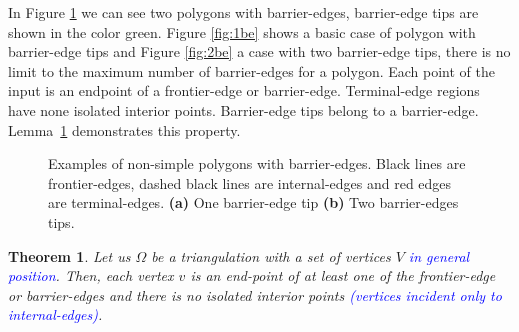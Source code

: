\documentclass[pdflatex,sn-mathphys]{sn-jnl}%
\theoremstyle{thmstyleone}%
\newtheorem{theorem}{Theorem}%
\theoremstyle{thmstyletwo}%
\theoremstyle{thmstylethree}%
\begin{document}
 
In Figure \ref{figs:kindofbarrieredges} we can see two polygons with barrier-edges, barrier-edge tips are shown in the color green. Figure \ref{fig:1be} shows a basic case of polygon with barrier-edge tips and Figure \ref{fig:2be} a case with two barrier-edge tips, there is no limit to the maximum number of barrier-edges for a polygon. Each point of the input is an endpoint of a frontier-edge or barrier-edge. Terminal-edge regions have none isolated interior points. Barrier-edge tips belong to a barrier-edge. Lemma~\ref{l:verticeslemma} demonstrates this property.



\begin{figure}[h]
\centering  
{}\hspace{2cm}
\hspace{0.5cm}

\caption{Examples of non-simple polygons with barrier-edges. Black lines are frontier-edges, dashed black lines are internal-edges and red edges are terminal-edges. \textbf{(a)} One barrier-edge tip \textbf{(b)} Two barrier-edges tips. }
\label{figs:kindofbarrieredges} 
\end{figure}





\begin{theorem}\label{l:verticeslemma}
Let us  $\Omega$ be a triangulation with a set of vertices $V$ \textcolor{blue}{in general position}. Then, each vertex $v$ is an end-point of at least one  of  the  frontier-edge or barrier-edges and  there is no isolated interior points \textcolor{blue}{(vertices incident only to internal-edges)}.
\end{theorem}
\end{document}
